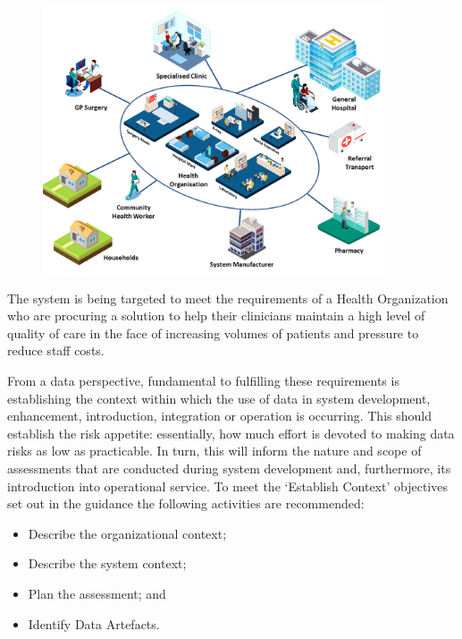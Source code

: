\begin{figure}[H]
  \centering
  \includegraphics[width=0.9\textwidth]{images/medicalscenario}
  \label{fig:medicalscenario}
\end{figure}

\clearpage
The system is being targeted to meet the requirements of a Health Organization who are procuring a solution to help their clinicians maintain a high level of quality of care in the face of increasing volumes of patients and pressure to reduce staff costs.

From a data perspective, fundamental to fulfilling these requirements is establishing the context within which the use of data in system development, enhancement, introduction, integration or operation is occurring. This should establish the risk appetite: essentially, how much effort is devoted to making data risks as low as practicable. In turn, this will inform the nature and scope of assessments that are conducted during system development and, furthermore, its introduction into operational service. To meet the `Establish Context' objectives set out in the guidance the following activities are recommended:

\begin{itemize}
	\item Describe the organizational context;
	\item Describe the system context;
	\item Plan the assessment; and
	\item Identify Data Artefacts.
\end{itemize}

